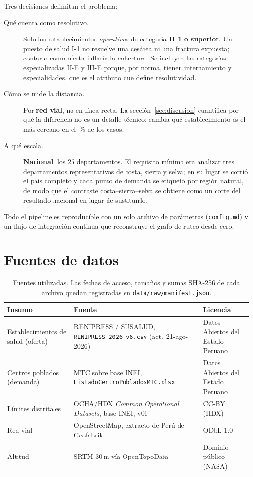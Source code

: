 \documentclass[10pt,a4paper]{article}
\begin{document}
Tres decisiones delimitan el problema:

\begin{description}
\item[Qué cuenta como resolutivo.] Solo los establecimientos \emph{operativos}
de categoría \textbf{II-1 o superior}. Un puesto de salud I-1 no resuelve una
cesárea ni una fractura expuesta; contarlo como oferta inflaría la cobertura.
Se incluyen las categorías especializadas II-E y III-E porque, por norma, tienen
internamiento y especialidades, que es el atributo que define resolutividad.
\item[Cómo se mide la distancia.] Por \textbf{red vial}, no en línea recta. La
sección~\ref{sec:discusion} cuantifica por qué la diferencia no es un detalle
técnico: cambia qué establecimiento es el más cercano en el
\kpiShareCambiaCercano\,\% de los casos.
\item[A qué escala.] \textbf{Nacional}, los 25 departamentos. El requisito
mínimo era analizar tres departamentos representativos de costa, sierra y selva;
en su lugar se corrió el país completo y cada punto de demanda se etiquetó por
región natural, de modo que el contraste costa--sierra--selva se obtiene como un
corte del resultado nacional en lugar de sustituirlo.
\end{description}

Todo el pipeline es reproducible con un solo archivo de parámetros
(\texttt{config.md}) y un flujo de integración continua que reconstruye el grafo
de ruteo desde cero.

\section{Fuentes de datos}
\label{sec:datos}

\begin{table}[htbp]
\centering
\footnotesize
\caption{Fuentes utilizadas. Las fechas de acceso, tamaños y sumas SHA-256 de
cada archivo quedan registradas en \texttt{data/raw/manifest.json}.}
\label{tab:fuentes}
\begin{tabular}{p{3.2cm}p{7.4cm}p{3.6cm}}
\toprule
\textbf{Insumo} & \textbf{Fuente} & \textbf{Licencia} \\
\midrule
Establecimientos de salud (oferta) &
RENIPRESS / SUSALUD, \texttt{RENIPRESS\_2026\_v6.csv} (act.\ 21-ago-2026) &
Datos Abiertos del Estado Peruano \\
Centros poblados (demanda) &
MTC sobre base INEI, \texttt{Listado\-Centro\-Poblados\-MTC.xlsx} &
Datos Abiertos del Estado Peruano \\
Límites distritales &
OCHA/HDX \emph{Common Operational Datasets}, base INEI, v01 &
CC-BY (HDX) \\
Red vial &
OpenStreetMap, extracto de Perú de Geofabrik &
ODbL 1.0 \\
Altitud &
SRTM 30\,m vía OpenTopoData &
Dominio público (NASA) \\
\bottomrule
\end{tabular}
\end{table}
\end{document}
